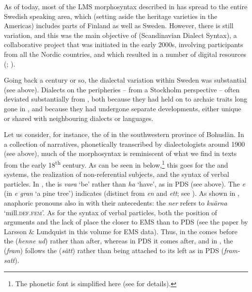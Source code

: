 \documentclass[output=paper]{langscibook}
\begin{document}
As of today, most of the LMS morphosyntax described in  has spread to the entire Swedish speaking area, which (setting aside the heritage varieties in the Americas) includes parts of Finland as well as Sweden. However, there is still variation, and this was the main objective of  (Scandinavian Dialect Syntax), a collaborative project that was initiated in the early 2000s, involving participants from all the Nordic countries, and which resulted in a number of digital resources (\citealt{JohannessenEtAl2009}; \citealt{LindstadEtAl2009}).



Going back a century or so, the dialectal variation within Sweden was substantial (see  above). Dialects on the peripheries – from a Stockholm perspective – often deviated substantially from , both because they had held on to archaic traits long gone in , and because they had undergone separate developments, either unique or shared with neighbouring dialects or languages.



Let us consider, for instance, the  of  in the southwestern province of Bohuslän. In a collection of  narratives, phonetically transcribed by dialectologists around 1900 (see  above), much of the morphosyntax is reminiscent of what we find in texts from the early 18\textsuperscript{th} century. As can be seen in  below,\footnote{The phonetic font is simplified here (see \citealt{Petzell2019,Petzell2020} for details).} this goes for the  and  systems, the realization of non-referential subjects, and the syntax of verbal particles. In , the  is \textit{vara} ‘be’ rather than \textit{ha} ‘have’, as in PDS (see  above). The  \textit{e} (in \textit{e gran} ‘a pine tree’) indicates   (distinct from  \textit{en} and  \textit{ett}; see ). As shown in , anaphoric pronouns also  in  with their antecedents: the   \textit{ner} refers to \textit{kuärna} ‘mill.\textsc{def}.\textsc{fem}’. As for the syntax of verbal particles, both the position of arguments and the lack of   place the   closer to EMS than to PDS (see the paper by Larsson \& Lundquist in this volume for EMS data). Thus, in  the  comes before the  (\textit{henne ud}) rather than after, whereas in PDS it comes after, and in , the  (\textit{fram}) follows the  (\textit{sätt}) rather than being attached to its left as in PDS (\textit{fram-satt}).
\end{document}
